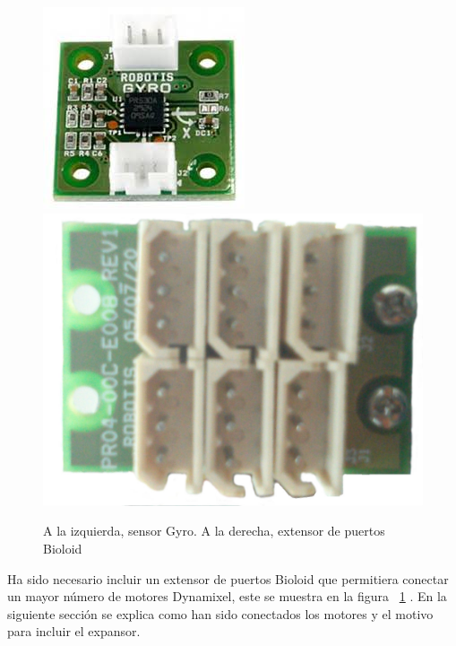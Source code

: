 \begin{figure}[hbtp]
\centering
\includegraphics[scale=0.35]{imagenes/gyro.jpg}
\includegraphics[scale=0.08]{imagenes/extensor.jpg}
\caption{A la izquierda, sensor Gyro. A la derecha, extensor de puertos Bioloid}
\label{fig:gyroYextensor}
\end{figure}

Ha sido necesario incluir un extensor de puertos Bioloid que permitiera conectar un mayor n\'umero de motores Dynamixel, este se muestra en la figura ~\ref{fig:gyroYextensor} \cite{hub}. En la siguiente secci\'on se explica como han sido conectados los motores y el motivo para incluir el expansor. 


